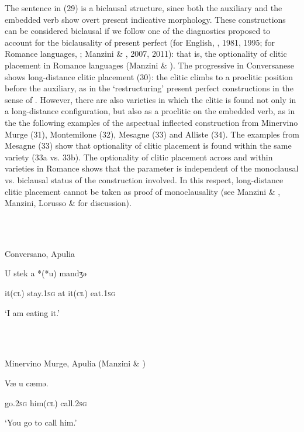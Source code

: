 \documentclass[output=paper]{langsci/langscibook}
\begin{document}
The sentence in (29) is a biclausal structure, since both the auxiliary and the embedded verb show overt present indicative morphology. These constructions can be considered biclausal if we follow one of the diagnostics proposed to account for the biclausality of present perfect (for English, \citealt{Chomsky1957}, 1981, 1995; for Romance languages, \citealt{Kayne1993}; Manzini \& \citealt{Savoia2005}, 2007, 2011): that is, the optionality of clitic placement in Romance languages (Manzini \& \citealt{Savoia2011}). The progressive in Conversanese shows long-distance clitic placement (30): the clitic climbs to a proclitic position before the auxiliary, as in the ‘restructuring’ present perfect constructions in the sense of \citet{Rizzi1982}. However, there are also varieties in which the clitic is found not only in a long-distance configuration, but also as a proclitic on the embedded verb, as in the the following examples of the aspectual inflected construction from Minervino Murge (31), Montemilone (32), Mesagne (33) and Alliste (34). The examples from Mesagne (33) show that optionality of clitic placement is found within the same variety (33a vs. 33b). The optionality of clitic placement across and within varieties in Romance shows that the parameter is independent of the monoclausal vs. biclausal status of the construction involved. In this respect, long-distance clitic placement cannot be taken as proof of monoclausality (see Manzini \& \citealt{Savoia2011}, Manzini, Lorusso \& \citealt{Savoia2017} for discussion).

\ea%
    \label{ex:key:30}
    \gll\\
        \\
    \glt
    \z

          Conversano, Apulia

U   stek    a   *(*u)  mandʒə 

it\textsc{(cl)} stay.\textsc{1sg} at  it\textsc{(cl)} eat.\textsc{1sg} 

‘I am eating it.’                 

\ea%
    \label{ex:key:31}
    \gll\\
        \\
    \glt
    \z

          Minervino Murge, Apulia (Manzini \& \citealt{Savoia2005})

Væ     u    cæmə. 

go.\textsc{2sg} him(\textsc{cl})   call.\textsc{2sg}    

‘You go to call him.’ 
\end{document}
